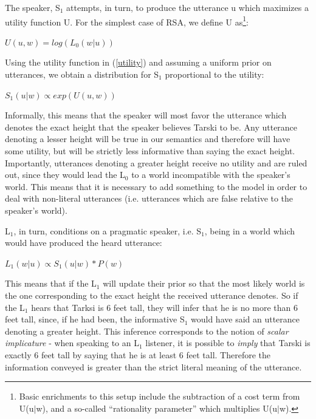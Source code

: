 \documentclass[10pt,letterpaper,twocolumn]{article}
\begin{document}
The speaker, S$_1$ attempts, in turn, to produce the utterance u which maximizes a utility function U. For the simplest case of RSA, we define U as\footnote{Basic enrichments to this setup include the subtraction of a cost term from U(u$\vert$w), and a so-called ``rationality parameter'' which multiplies U(u$\vert$w).}:

\begin{exe}
\ex $U(u,w) = log(L_0(w\vert u))$ \label{utility}
\end{exe}

Using the utility function in (\ref{utility}) and assuming a uniform prior on utterances, we obtain a distribution for S$_1$ proportional to the utility:
\begin{exe}
\ex $S_1(u\vert w) \propto exp(U(u,w))$
\end{exe}

Informally, this means that the speaker will most favor the utterance which denotes the exact height that the speaker believes Tarski to be. Any utterance denoting a lesser height will be true in our semantics and therefore will have some utility, but will be strictly less informative than saying the exact height. Importantly, utterances denoting a greater height receive no utility and are ruled out, since they would lead the L$_0$ to a world incompatible with the speaker's world. This means that it is necessary to add something to the model in order to deal with non-literal utterances (i.e. utterances which are false relative to the speaker's world).

L$_1$, in turn, conditions on a pragmatic speaker, i.e. S$_1$, being in a world which would have produced the heard utterance:
\begin{exe}
\ex $L_1(w\vert u) \propto S_1(u\vert w)*P(w)$
\end{exe}

This means that if the L$_1$ will update their prior so that the most likely world is the one corresponding to the exact height the received utterance denotes. So if the L$_1$ hears that Tarksi is 6 feet tall, they will infer that he is no more than 6 feet tall, since, if he had been, the informative S$_1$ would have said an utterance denoting a greater height. This inference corresponds to the notion of \emph{scalar implicature} - when speaking to an L$_1$ listener, it is possible to \emph{imply} that Tarski is exactly 6 feet tall by saying that he is at least 6 feet tall. Therefore the information conveyed is greater than the strict literal meaning of the utterance. 
\end{document}
